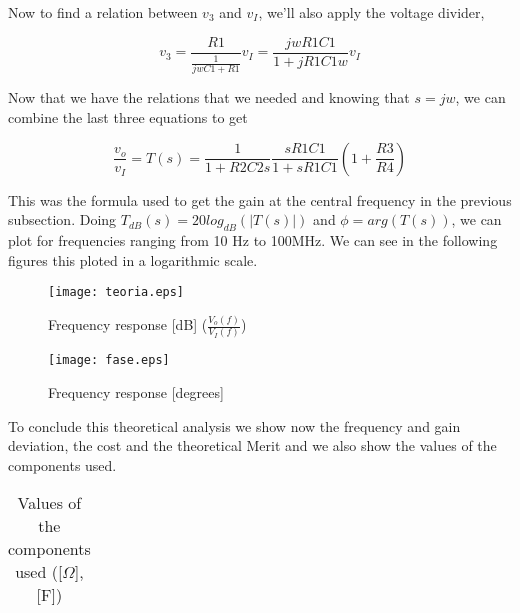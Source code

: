 \par Now to find a relation between $v_3$ and $v_I$, we'll also apply the voltage divider, 

\begin{equation}
	v_3 = \frac{R1}{\frac{1}{jwC1 + R1}}v_I = \frac{jwR1C1}{1 + jR1C1w}v_I
\end{equation}

\par Now that we have the relations that we needed and knowing that $s=jw$, we can combine the last three equations to get

\begin{equation}
	\frac{v_o}{v_I} = T(s) = \frac{1}{1 + R2 C2 s} \frac{s R1 C1}{1 + s R1 C1} (1 + \frac{R3}{R4})
\end{equation}

\par This was the formula used to get the gain at the central frequency in the previous subsection. Doing $T_{dB}(s) = 20log_{dB}(|T(s)|)$ and $\phi = arg(T(s))$, we can plot for frequencies ranging from 10 Hz to 100MHz. We can see in the following figures this ploted in a logarithmic scale.

\begin{figure}[H] 
	\centering
	\texttt{[image: teoria.eps]}
	\caption{Frequency response [dB] ($\frac{V_o(f)}{V_I(f)}$)}
\end{figure}

\begin{figure}[H] 
	\centering
	\texttt{[image: fase.eps]}
	\caption{Frequency response [degrees]}
\end{figure}

\par To conclude this theoretical analysis we show now the frequency and gain deviation, the cost and the theoretical Merit and we also show the values of the components used.

\vspace{5mm}
\begin{table}[H]
	\centering
	\begin{tabularx}{0.9\textwidth} {
 	    | >{\raggedright\arraybackslash}X
  	    | >{\raggedleft\arraybackslash}X | }
	\hline
	
	\end{tabularx}
	\caption{Values of the components used ([$\Omega$],[F])}
	\label{tab:currents}
\end{table}
\vspace{5mm}

